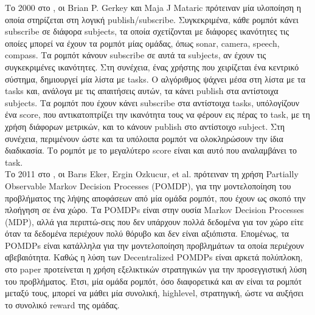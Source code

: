 	Το 2000 στο \cite{Gerkey2000}, οι Brian P. Gerkey και Maja J Mataric πρότειναν μία υλοποίηση η οποία στηρίζεται στη 
	λογική publish/subscribe. Συγκεκριμένα, κάθε ρομπότ κάνει subscribe σε διάφορα subjects, τα οποία σχετίζονται με διάφορες 
	ικανότητες τις οποίες μπορεί να έχουν τα ρομπότ μίας ομάδας, όπως sonar, camera, speech, compass. Τα ρομπότ κάνουν subscribe 
	σε αυτά τα subjects, αν έχουν τις συγκεκριμένες ικανότητες. Στη συνέχεια, ένας χρήστης που χειρίζεται ένα κεντρικό σύστημα, 
	δημιουργεί μία λίστα με tasks. Ο αλγόριθμος ψάχνει μέσα στη λίστα με τα tasks και, ανάλογα με τις απαιτήσεις αυτών, 
	τα κάνει publish στα αντίστοιχα subjects. Τα ρομπότ που έχουν κάνει subscribe στα αντίστοιχα tasks, υπόλογίζουν ένα score, 
	που αντικατοπτρίζει την ικανότητα τους να φέρουν εις πέρας το task, με τη χρήση διάφορων μετρικών, και το κάνουν publish στο 
	αντίστοιχο subject. Στη συνέχεια, περιμένουν ώστε και τα υπόλοιπα ρομπότ να ολοκληρώσουν την ίδια διαδικασία. Το ρομπότ με 
	το μεγαλύτερο score είναι και αυτό που αναλαμβάνει το task. \\
	
	Το 2011 στο \cite{Eker2011}, οι Barıs Eker, Ergin Ozkucur, et al. πρότειναν τη 
	χρήση Partially Observable Markov Decision Processes (POMDP), για την μοντελοποίηση του προβλήματος της λήψης αποφάσεων από μία 
	ομάδα ρομπότ, που έχουν ως σκοπό την πλοήγηση σε ένα χώρο. Τα POMDPs είναι στην ουσία Markov Decision Processes (MDP), αλλά για περιπτώ-σεις 
	που δεν υπάρχουν πολλά δεδομένα για τον χώρο είτε όταν τα δεδομένα περιέχουν πολύ θόρυβο και δεν είναι αξιόπιστα. Επομένως, 
	τα POMDPs είναι κατάλληλα για την μοντελοποίηση προβλημάτων τα οποία περιέχουν αβεβαιότητα. Καθώς η λύση των Decentralized POMDPs είναι 
	αρκετά πολύπλοκη, στο paper προτείνεται η χρήση εξελικτικών στρατηγικών για την προσεγγιστική λύση του προβλήματος. Έτσι, μία ομάδα ρομπότ, 
	όσο διαφορετικά και αν είναι τα ρομπότ μεταξύ τους, μπορεί να μάθει μία συνολική, highlevel, στρατηγική, ώστε να αυξήσει το συνολικό reward 
	της ομάδας.\\
	
